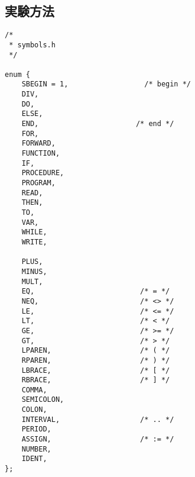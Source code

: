 \documentclass[uplatex]{jsarticle}
\begin{document}
\subsection{実験方法}
\begin{lstlisting}[caption=symbol.h,label=lst:ex1:symbol.h]
/*
 * symbols.h
 */

enum {
    SBEGIN = 1,                  /* begin */
    DIV,
    DO,
    ELSE,
    END,                       /* end */
    FOR,
    FORWARD,
    FUNCTION,
    IF,
    PROCEDURE,
    PROGRAM,
    READ,
    THEN,
    TO,
    VAR,
    WHILE,
    WRITE,

    PLUS,
    MINUS,
    MULT,
    EQ,                         /* = */
    NEQ,                        /* <> */
    LE,                         /* <= */
    LT,                         /* < */
    GE,                         /* >= */
    GT,                         /* > */
    LPAREN,                     /* ( */
    RPAREN,                     /* ) */
    LBRACE,                     /* [ */
    RBRACE,                     /* ] */
    COMMA,
    SEMICOLON,
    COLON,
    INTERVAL,                   /* .. */
    PERIOD,
    ASSIGN,                     /* := */
    NUMBER,
    IDENT,
};
\end{lstlisting}
\end{document}
